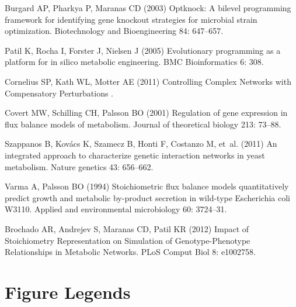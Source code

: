 \documentclass[10pt]{article}
\begin{document}
\begin{thebibliography}{10}
Burgard AP, Pharkya P, Maranas CD (2003) {Optknock: A bilevel programming
  framework for identifying gene knockout strategies for microbial strain
  optimization}.
\newblock Biotechnology and Bioengineering 84: 647--657.

Patil K, Rocha I, Forster J, Nielsen J (2005) {Evolutionary programming as a
  platform for in silico metabolic engineering}.
\newblock BMC Bioinformatics 6: 308.

Cornelius SP, Kath WL, Motter AE (2011) {Controlling Complex Networks with
  Compensatory Perturbations} .

Covert MW, Schilling CH, Palsson BO (2001) {Regulation of gene expression in
  flux balance models of metabolism.}
\newblock Journal of theoretical biology 213: 73--88.

Szappanos B, Kov\'{a}cs K, Szamecz B, Honti F, Costanzo M, et~al. (2011) {An
  integrated approach to characterize genetic interaction networks in yeast
  metabolism.}
\newblock Nature genetics 43: 656--662.

Varma A, Palsson BO (1994) {Stoichiometric flux balance models quantitatively
  predict growth and metabolic by-product secretion in wild-type Escherichia
  coli W3110.}
\newblock Applied and environmental microbiology 60: 3724--31.

Brochado AR, Andrejev S, Maranas CD, Patil KR (2012) {Impact of Stoichiometry
  Representation on Simulation of Genotype-Phenotype Relationships in Metabolic
  Networks}.
\newblock PLoS Comput Biol 8: e1002758.

\end{thebibliography}

\section*{Figure Legends}
%
\end{document}
